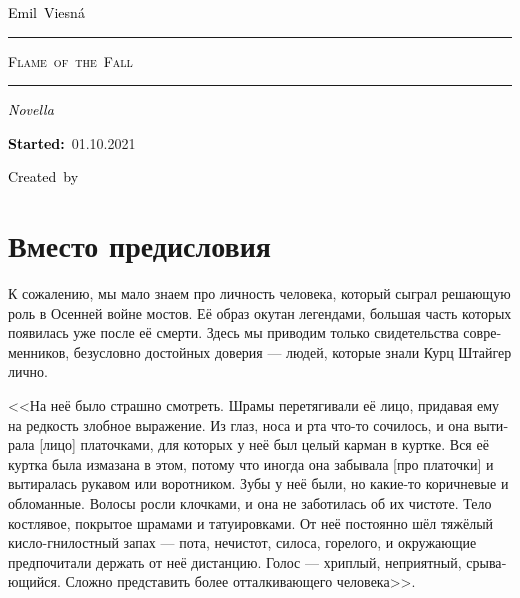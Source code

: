 \documentclass[a4paper,12pt,fleqn]{book}\usepackage{cooltooltips}\usepackage{polyglossia}\setdefaultlanguage[babelshorthands=true]{russian}\setotherlanguage{english}\defaultfontfeatures{Ligatures=TeX,Mapping=tex-text} \usepackage{xcolor}\definecolor{lightgray}{HTML}{bbbbbb}\color{lightgray}\newcommand{\ml}[3]{\textenglish{\textcolor{black}{#3}}}
\newcommand{\tofaauthor}{\ml{$0$}{Эмиль~Весна}{Emil~Viesn\'{a}}}
\newcommand{\tofatitle}{\ml{$0$}{ПЛАМЯ~ОСЕНИ}{Flame~of~the~Fall}}
\newcommand{\tofastarted}{01.10.2021}
\newcommand{\asterism}{\vspace{1em}{\centering\Large\bfseries$\ast~\ast~\ast$\par}\vspace{1em}}
\begin{document}

\begin{titlepage}
{\centering{~\par}\vspace{0.25\textheight}
{\LARGE\tofaauthor}\par
\vspace{1.0cm}\rule{17em}{1pt}\par\vspace{0.3cm}
{\Huge\textsc{\tofatitle}\par}
\vspace{0.3cm}\rule{17em}{2pt}\par\vspace{1.0cm}
{\Large\textit{\ml{$0$}{Повесть}{Novella}}\par}
\vspace{0.5cm}\asterism\par\vspace{1.0cm}
{\textbf{\ml{$0$}{Начато:}{Started:}}~\tofastarted\par}\vfill
{\Large\ml{$0$}{Создано~в}{Created~by}~\XeLaTeX}\par}
\end{titlepage}

\tableofcontents

\section{Вместо предисловия}

К сожалению, мы мало знаем про личность человека, который сыграл решающую роль в Осенней войне мостов.
Её образ окутан легендами, большая часть которых появилась уже после её смерти.
Здесь мы приводим только свидетельства современников, безусловно достойных доверия --- людей, которые знали Курц Штайгер лично.

<<На неё было страшно смотреть.
Шрамы перетягивали её лицо, придавая ему на редкость злобное выражение.
Из глаз, носа и рта что-то сочилось, и она вытирала [лицо] платочками, для которых у неё был целый карман в куртке.
Вся её куртка была измазана в этом, потому что иногда она забывала [про платочки] и вытиралась рукавом или воротником.
Зубы у неё были, но какие-то коричневые и обломанные.
Волосы росли клочками, и она не заботилась об их чистоте.
Тело костлявое, покрытое шрамами и татуировками.
От неё постоянно шёл тяжёлый кисло-гнилостный запах --- пота, нечистот, силоса, горелого, и окружающие предпочитали держать от неё дистанцию.
Голос --- хриплый, неприятный, срывающийся.
Сложно представить более отталкивающего человека>>.
\end{document}
